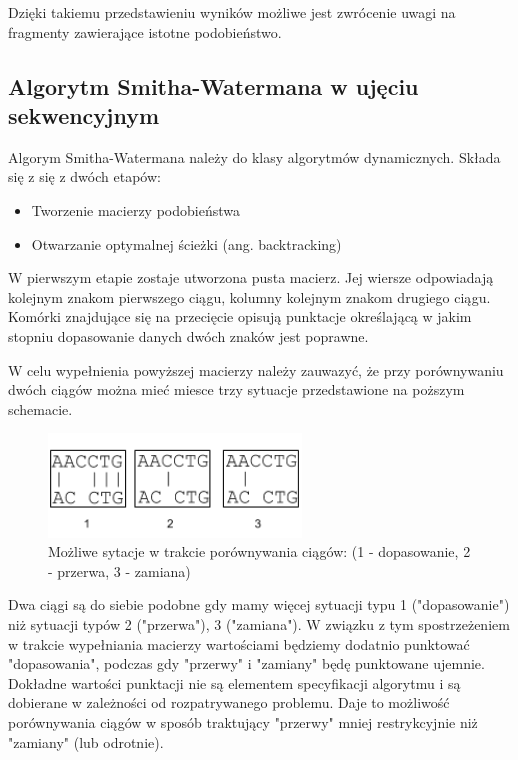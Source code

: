 \documentclass[a4paper,12pt]{article}
\newenvironment{lista}{
\begin{itemize}
  \setlength{\itemsep}{1pt}
  \setlength{\parskip}{0pt}
  \setlength{\parsep}{0pt}
}{\end{itemize}}
\begin{document}
Dzięki takiemu przedstawieniu wyników możliwe jest zwrócenie uwagi na fragmenty zawierające istotne podobieństwo. 


\subsection*{Algorytm Smitha-Watermana w ujęciu sekwencyjnym}

Algorym Smitha-Watermana należy do klasy algorytmów dynamicznych. Składa się z się z dwóch etapów:
\begin{lista}
 \item Tworzenie macierzy podobieństwa
\item Otwarzanie optymalnej ścieżki (ang. backtracking)
\end{lista}

W pierwszym etapie zostaje utworzona pusta macierz. Jej wiersze odpowiadają kolejnym znakom pierwszego ciągu, kolumny kolejnym znakom drugiego ciągu. Komórki znajdujące się na przecięcie opisują punktacje określającą w jakim stopniu dopasowanie danych dwóch znaków jest poprawne. 

W celu wypełnienia powyższej macierzy należy zauwazyć, że przy porównywaniu dwóch ciągów można mieć miesce trzy sytuacje przedstawione na poższym schemacie.

\begin{figure}[h]
  \vspace{5pt}
  \centering
  \begin{center}
  \includegraphics[width=0.6\textwidth]{images/TypySytuacjiPrzyDopasowaniu.png}
  \end{center}
  \caption{Możliwe sytacje w trakcie porównywania ciągów: (1 - dopasowanie, 2 - przerwa, 3 - zamiana)}
 \end{figure}


Dwa ciągi są do siebie podobne gdy mamy więcej sytuacji typu 1 ("dopasowanie") niż sytuacji typów 2 ("przerwa"), 3 ("zamiana"). W związku z tym spostrzeżeniem w trakcie wypełniania macierzy wartościami będziemy dodatnio punktować "dopasowania", podczas gdy "przerwy" i "zamiany" będę punktowane ujemnie. Dokładne wartości punktacji nie są elementem specyfikacji algorytmu i są dobierane w zależności od rozpatrywanego problemu. Daje to możliwość porównywania ciągów w sposób traktujący "przerwy" mniej restrykcyjnie niż "zamiany" (lub odrotnie). 
\end{document}
